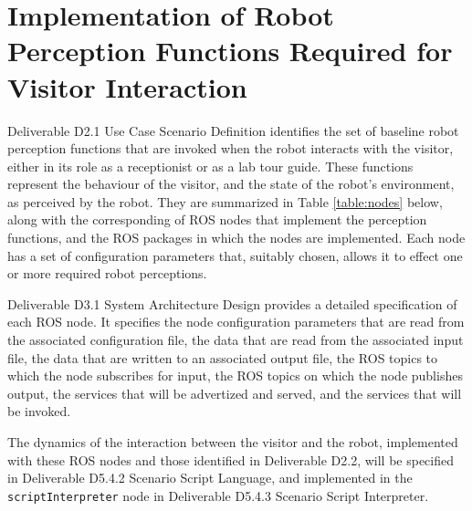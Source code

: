 \documentclass{CSSRforAfrica}
\begin{document}
\newpage
 
 
\pagebreak
\tableofcontents
\newpage


\section{Implementation of Robot Perception Functions Required for Visitor Interaction}
Deliverable D2.1 Use Case Scenario Definition identifies the set of baseline robot perception functions that are invoked when the robot interacts with the visitor, either in its role as a receptionist or as a lab tour guide.   These functions represent the behaviour of the visitor, and the state of the robot’s environment, as perceived by the robot.   They are summarized in Table \ref{table:nodes} below, along with the corresponding of ROS nodes that implement the perception functions, and the ROS packages in which the nodes are implemented.  Each node has a set of  configuration parameters that, suitably chosen, allows it to effect one or more required robot perceptions. 

Deliverable D3.1 System Architecture Design provides a detailed specification of each ROS node. It specifies the node configuration parameters that are read from the associated configuration file, the data that are read from the associated input file, the data that are written to an associated output file, the ROS topics to which the node subscribes for input,  the ROS topics on which the node publishes output, the services that will be advertized and served, and the services that will be invoked.

The dynamics of the interaction between the visitor and the robot, implemented with these  ROS nodes and those identified in Deliverable D2.2, will be specified in Deliverable D5.4.2 Scenario Script Language, and implemented in the {\small \verb+scriptInterpreter+} node in Deliverable D5.4.3 Scenario Script Interpreter.
\end{document}
